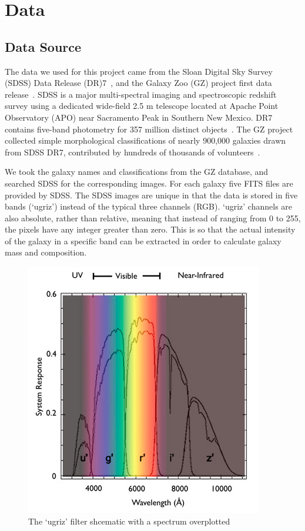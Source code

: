 \section{Data}
\label{sec:data}
\subsection{Data Source}
\label{sec:data_source}
The data we used for this project came from the Sloan Digital Sky Survey (SDSS) Data Release (DR)7~\cite{abazajian2009seventh}, and the Galaxy Zoo (GZ) project first data release~\cite{lintott2010galaxy}. 
SDSS is a major multi-spectral imaging and spectroscopic redshift survey using a dedicated wide-field 2.5 m telescope located at Apache Point Observatory (APO) near Sacramento Peak in Southern New Mexico.
DR7 contains five-band photometry for 357 million distinct objects~\cite{abazajian2009seventh}. 
The GZ project collected simple morphological classifications of nearly 900,000 galaxies drawn from SDSS DR7, contributed by hundreds of thousands of volunteers~\cite{lintott2010galaxy}. 

We took the galaxy names and classifications from the GZ database, and searched SDSS for the corresponding images. For each galaxy five FITS files are provided by SDSS.
The SDSS images are unique in that the data is stored in five bands (`ugriz') instead of the typical three channels (RGB). 
`ugriz' channels are also absolute, rather than relative, meaning that instead of ranging from 0 to 255, the pixels have any integer greater than zero. 
This is so that the actual intensity of the galaxy in a specific band can be extracted in order to calculate galaxy mass and composition.


\begin{figure}[h!]
	\centering
	\captionsetup{justification=centering}
	\includegraphics[scale=0.5]{Figures/filters.jpg}
	\caption{The `ugriz' filter shcematic with a spectrum overplotted}
	\label{fig:filters}
\end{figure}



